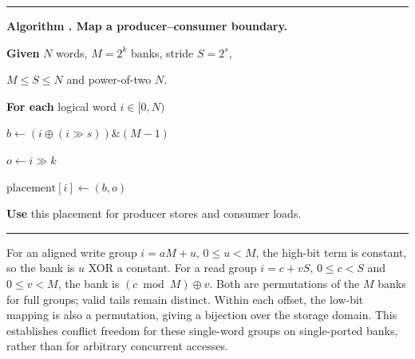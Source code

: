 \par\smallskip
\noindent\begin{minipage}{\columnwidth}
\label{alg:boundary-map}
\hrule\smallskip
\textbf{Algorithm \theboundaryalgorithm. Map a producer--consumer boundary.}
\par\smallskip
\small
\textbf{Given} $N$ words, $M=2^k$ banks, stride $S=2^s$,\par
\hspace*{1em}$M\le S\le N$ and power-of-two $N$.\par
\textbf{For each} logical word $i\in[0,N)$\par
\hspace*{1em}$b\gets(i\mathbin{\oplus}(i\gg s))\mathbin{\&}(M-1)$\par
\hspace*{1em}$o\gets i\gg k$\par
\hspace*{1em}$\mathrm{placement}[i]\gets(b,o)$\par
\textbf{Use} this placement for producer stores and consumer loads.\par
\smallskip\hrule
\end{minipage}
\par\smallskip

For an aligned write group $i=aM+u$, $0\le u<M$, the high-bit term is
constant, so the bank is $u$ XOR a constant. For a read group
$i=c+vS$, $0\le c<S$ and $0\le v<M$, the bank is
$(c\bmod M)\mathbin{\oplus}v$. Both are permutations of the $M$ banks
for full groups; valid tails remain distinct. Within each offset, the
low-bit mapping is also a permutation, giving a bijection over the storage
domain. This establishes conflict freedom for these single-word groups on
single-ported banks, rather than for arbitrary concurrent accesses.



